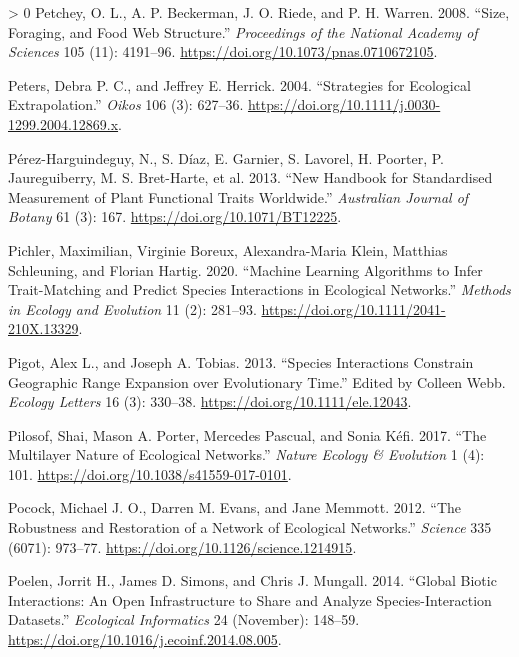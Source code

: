 \documentclass[10pt,oneside]{article}
\newlength{\cslhangindent}
\newenvironment{CSLReferences}[3] %
 {%
  \setlength{\parindent}{0pt}
  \ifodd #1 \everypar{\setlength{\hangindent}{\cslhangindent}}\ignorespaces\fi
  \ifnum #2 > 0
  \setlength{\parskip}{#2\baselineskip}
  \fi
 }%
 {}
\begin{document}
\begin{CSLReferences}{1}{0}
\leavevmode\hypertarget{ref-Petchey2008SizFor}{}%
Petchey, O. L., A. P. Beckerman, J. O. Riede, and P. H. Warren. 2008.
{``Size, Foraging, and Food Web Structure.''} \emph{Proceedings of the
National Academy of Sciences} 105 (11): 4191--96.
\url{https://doi.org/10.1073/pnas.0710672105}.

\leavevmode\hypertarget{ref-Peters2004StrEco}{}%
Peters, Debra P. C., and Jeffrey E. Herrick. 2004. {``Strategies for
Ecological Extrapolation.''} \emph{Oikos} 106 (3): 627--36.
\url{https://doi.org/10.1111/j.0030-1299.2004.12869.x}.

\leavevmode\hypertarget{ref-Perez-Harguindeguy2013NewHan}{}%
Pérez-Harguindeguy, N., S. Díaz, E. Garnier, S. Lavorel, H. Poorter, P.
Jaureguiberry, M. S. Bret-Harte, et al. 2013. {``New Handbook for
Standardised Measurement of Plant Functional Traits Worldwide.''}
\emph{Australian Journal of Botany} 61 (3): 167.
\url{https://doi.org/10.1071/BT12225}.

\leavevmode\hypertarget{ref-Pichler2020MacLea}{}%
Pichler, Maximilian, Virginie Boreux, Alexandra-Maria Klein, Matthias
Schleuning, and Florian Hartig. 2020. {``Machine Learning Algorithms to
Infer Trait-Matching and Predict Species Interactions in Ecological
Networks.''} \emph{Methods in Ecology and Evolution} 11 (2): 281--93.
\url{https://doi.org/10.1111/2041-210X.13329}.

\leavevmode\hypertarget{ref-Pigot2013SpeInt}{}%
Pigot, Alex L., and Joseph A. Tobias. 2013. {``Species Interactions
Constrain Geographic Range Expansion over Evolutionary Time.''} Edited
by Colleen Webb. \emph{Ecology Letters} 16 (3): 330--38.
\url{https://doi.org/10.1111/ele.12043}.

\leavevmode\hypertarget{ref-Pilosof2017MulNat}{}%
Pilosof, Shai, Mason A. Porter, Mercedes Pascual, and Sonia Kéfi. 2017.
{``The Multilayer Nature of Ecological Networks.''} \emph{Nature Ecology
\& Evolution} 1 (4): 101. \url{https://doi.org/10.1038/s41559-017-0101}.

\leavevmode\hypertarget{ref-Pocock2012RobRes}{}%
Pocock, Michael J. O., Darren M. Evans, and Jane Memmott. 2012. {``The
Robustness and Restoration of a Network of Ecological Networks.''}
\emph{Science} 335 (6071): 973--77.
\url{https://doi.org/10.1126/science.1214915}.

\leavevmode\hypertarget{ref-Poelen2014GloBio}{}%
Poelen, Jorrit H., James D. Simons, and Chris J. Mungall. 2014.
{``Global Biotic Interactions: An Open Infrastructure to Share and
Analyze Species-Interaction Datasets.''} \emph{Ecological Informatics}
24 (November): 148--59.
\url{https://doi.org/10.1016/j.ecoinf.2014.08.005}.


\end{CSLReferences}
\end{document}
